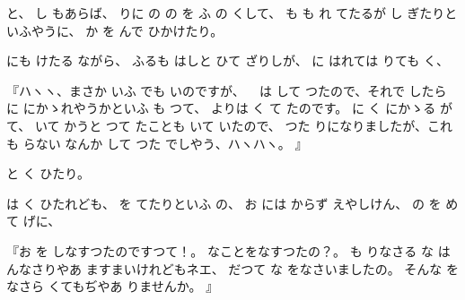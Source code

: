 と、
し
もあらば、
りに
の
の
を
ふ
の
くして、
も
も
れ
てたるが
し
ぎたりといふやうに、
か
を
んで
ひかけたり。

にも
けたる
ながら、
ふるも
はしと
ひて
ざりしが、
に
はれては
りても
く、

『ハヽヽ、まさか
いふ
でも
いのですが、
\ %
は
して
つたので、それで
したら
に
にかゝれやうかといふ
も
つて、
よりは
く
て
たのです。
に
く
にかゝる
が
て、
いて
かうと
つて
たことも
いて
いたので、
つた
りになりましたが、これも
らない
なんか
して
つた
でしやう、ハヽハヽ。
』

と
く
ひたり。

は
く
ひたれども、
を
てたりといふ
の、
お
には
からず
えやしけん、
の
を
めて
げに、

『お
を
しなすつたのですつて！。
なことをなすつたの？。
も
りなさる
な
は
んなさりやあ
ますまいけれどもネエ、
だつて
な
をなさいましたの。
そんな
をなさら
くてもぢやあ
りませんか。
』

